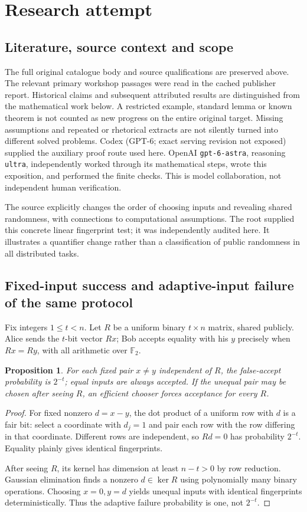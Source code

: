 \documentclass[11pt]{article}
\newtheorem{proposition}{Proposition}
\begin{document}
\section{Research attempt}
\subsection{Literature, source context and scope}
The full original catalogue body and source qualifications are preserved above. The relevant primary workshop passages were read in the cached publisher report. Historical claims and subsequent attributed results are distinguished from the mathematical work below. A restricted example, standard lemma or known theorem is not counted as new progress on the entire original target. Missing assumptions and repeated or rhetorical extracts are not silently turned into different solved problems.
Codex (GPT-6; exact serving revision not exposed) supplied the auxiliary proof route used here. OpenAI \texttt{gpt-6-astra}, reasoning \texttt{ultra}, independently worked through its mathematical steps, wrote this exposition, and performed the finite checks. This is model collaboration, not independent human verification.

The source explicitly changes the order of choosing inputs and revealing shared randomness, with connections to computational assumptions. The root supplied this concrete linear fingerprint test; it was independently audited here. It illustrates a quantifier change rather than a classification of public randomness in all distributed tasks.
\subsection{Fixed-input success and adaptive-input failure of the same protocol}
Fix integers $1\le t<n$. Let $R$ be a uniform binary $t\times n$ matrix, shared publicly. Alice sends the $t$-bit vector $Rx$; Bob accepts equality with his $y$ precisely when $Rx=Ry$, with all arithmetic over $\mathbb F_2$.
\begin{proposition}
For each fixed pair $x\ne y$ independent of $R$, the false-accept probability is $2^{-t}$; equal inputs are always accepted. If the unequal pair may be chosen after seeing $R$, an efficient chooser forces acceptance for every $R$.
\end{proposition}
\begin{proof}
For fixed nonzero $d=x-y$, the dot product of a uniform row with $d$ is a fair bit: select a coordinate with $d_j=1$ and pair each row with the row differing in that coordinate. Different rows are independent, so $Rd=0$ has probability $2^{-t}$. Equality plainly gives identical fingerprints.

After seeing $R$, its kernel has dimension at least $n-t>0$ by row reduction. Gaussian elimination finds a nonzero $d\in\ker R$ using polynomially many binary operations. Choosing $x=0,y=d$ yields unequal inputs with identical fingerprints deterministically. Thus the adaptive failure probability is one, not $2^{-t}$.
\end{proof}
\end{document}

